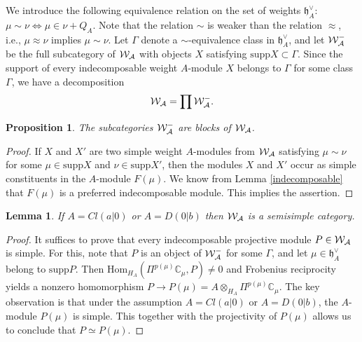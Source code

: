 \documentclass[12pt]{amsart}
\makeatletter
\def\mathcal{\cal}
\def\@putname#1#2#3#4{\def\@@ref{#3}\let\old@bf\bf
        \def\bf##1{\old@bf\if?\noexpand##1?{#4}\else##1\fi}%
	#1{#2}%
        \let\bf\old@bf}
\def\@putname#1#2#3#4{\def\@@ref{#3}\let\old@bf\bf	%
	\let\old@reset@font\reset@font			%
        \def\bf##1{\old@bf\if?\noexpand##1?{#4}\else##1\fi}%
	\def\reset@font##1##2{\old@reset@font##1\if?\noexpand##2?{#4}\else##2\fi}#1{#2}%
        \let\bf\old@bf\let\reset@font\old@reset@font}
\let\my@ref=\ref
\def\ref#1{\@putname\my@ref{#1}{#1}{\tiny\rm\@@ref}}
\theoremstyle{plain} %
\numberwithin{equation}{section}
\theoremstyle{definition}
\theoremstyle{remark}
\theoremstyle{plain} %
\newtheorem{lemma}[definition]{Lemma}
\newtheorem{proposition}[definition]{Proposition}
\newcommand{\cW}{\mathcal{W}}
\newcommand{\Hom}{\mathrm{Hom}}
\newcommand{\supp}{\mathrm{supp}}
\newcommand{\C}{\mathbb{C}}
\newcommand{\gh}{\mathfrak{h}}
\def\gh{\mathfrak{h}}
\makeatother
\begin{document}
      We introduce the following equivalence relation on the set of weights $\gh^{\vee}_A$:
 $\mu\sim\nu \Longleftrightarrow \mu\in\nu+Q_A$. Note that  the relation $\sim$ is weaker than the relation $\approx$, i.e.,   $\mu \approx\nu$ implies $\mu\sim\nu$.  Let $\Gamma$ denote a $\sim$-equivalence class in $\gh^{\vee}_A$, and let $\cW_A^\Gamma$ be the full subcategory of $\cW_A$ with objects $X$ satisfying $\supp X\subset\Gamma$.
 Since the support of every indecomposable weight $A$-module $X$ belongs to $\Gamma$ for some class $\Gamma$, we have a decomposition
 $$\cW_A=\prod \cW_A^\Gamma.$$

        \begin{proposition}\label{blocks} The subcategories $\cW_A^\Gamma$ are blocks of $\cW_A$. 
 \end{proposition}
 \begin{proof} If $X$ and $X'$ are two simple weight $A$-modules from $\cW_A$ satisfying  $\mu\sim\nu$ for some 
  $\mu\in \supp X$ and
   $\nu\in\supp X'$, then the modules $X$ and $X'$  occur as simple constituents in the $A$-module $F(\mu)$.  We know from Lemma \ref{indecomposable} that  $F(\mu)$ is a preferred indecomposable module. This implies the assertion.
   \end{proof}
   

        
    
   \begin{lemma}\label{semisimplicity} If $A=Cl(a|0)$ or $A=D(0|b)$ then $\cW_A$ is a semisimple category.
   \end{lemma}
   \begin{proof} It suffices to prove that every indecomposable projective module $P \in \cW_A$ is simple. For this, note that $P$ is an object of $\cW_A^\Gamma$ for some $\Gamma$, and let $\mu  \in \gh_A^{\vee}$ belong to $\supp P$. Then $\Hom_{H_A} (\Pi^{p(\mu)}\C_{\mu}, P) \neq 0$ and Frobenius reciprocity yields a nonzero homomorphism $P \to P(\mu) = A\otimes_{H_A}\Pi^{p(\mu)} \mathbb C_\mu$.  The key observation is that under the assumption  $A=Cl(a|0)$ or $A=D(0|b)$,  the $A$-module $P(\mu)$ is simple. This together with the projectivity of  $P(\mu)$  allows us to conclude that $P \simeq P(\mu)$.
     \end{proof}
    
\end{document}
